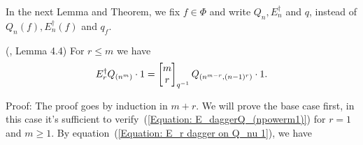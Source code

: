 In the next Lemma and Theorem, we fix $f\in \Phi$ and write $Q_n, E_n^\dagger$ and $q$, instead of $Q_n(f),E_n^\dagger(f)$ and $q_f$.
\begin{dang}
    \begin{lemma}(\cite{jing2024characters}, Lemma 4.4)\label{Lemma: E_daggerQ_(npowerm1)}
    For $r\leq m$ we have
    \begin{equation}\label{Equation: E_daggerQ_(npowerm1)}
        E_r^\dagger Q_{(n^m)}\cdot1= \begin{bmatrix} m\\r\end{bmatrix}_{q^{-1}}Q_{(n^{m-r},(n-1)^r)}\cdot1.
    \end{equation}
    \end{lemma}
\end{dang}
Proof: The proof goes by induction in $m+r$. We will prove the base case first, in this case it's sufficient to verify~(\ref{Equation: E_daggerQ_(npowerm1)}) for $r=1$ and $m\geq1$. By equation~(\ref{Equation: E_r dagger on Q_nu 1}), we have

